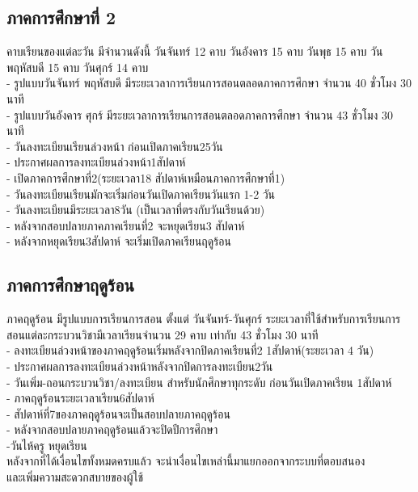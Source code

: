 \subsection{ภาคการศึกษาที่ 2}
  คาบเรียนของแต่ละวัน มีจำนวนดังนี้ วันจันทร์ 12 คาบ วันอังคาร 15 คาบ วันพุธ 15 คาบ วันพฤหัสบดี 15 คาบ วันศุกร์ 14 คาบ \\
  - รูปแบบวันจันทร์ พฤหัสบดี มีระยะเวลาการเรียนการสอนตลอดภาคการศึกษา จำนวน 40 ชั่วโมง 30 นาที \\
  - รูปแบบวันอังคาร ศุกร์ มีระยะเวลาการเรียนการสอนตลอดภาคการศึกษา จำนวน 43 ชั่วโมง 30 นาที \\
  - วันลงทะเบียนเรียนล่วงหน้า ก่อนเปิดภาคเรียน25วัน \\
  - ประกาศผลการลงทะเบียนล่วงหน้า1สัปดาห์ \\
  - เปิดภาคการศึกษาที่2(ระยะเวลา18 สัปดาห์เหมือนภาคการศึกษาที่1) \\
  - วันลงทะเบียนเรียนมักจะเริ่มก่อนวันเปิดภาคเรียนวันแรก 1-2 วัน \\
  - วันลงทะเบียนมีระยะเวลา8วัน (เป็นเวลาที่ตรงกับวันเรียนด้วย) \\
  - หลังจากสอบปลายภาคภาคเรียนที่2 จะหยุดเรียน3 สัปดาห์ \\
  - หลังจากหยุดเรียน3สัปดาห์ จะเริ่มเปิดภาคเรียนฤดูร้อน \\
\subsection{ภาคการศึกษาฤดูร้อน}
  ภาคฤดูร้อน มีรูปแบบการเรียนการสอน ตั้งแต่ วันจันทร์-วันศุกร์ ระยะเวลาที่ใช้สำหรับการเรียนการสอนแต่ละกระบวนวิชามีเวลาเรียนจำนวน 29 คาบ เท่ากับ 43 ชั่วโมง 30 นาที \\
  - ลงทะเบียนล่วงหน้าของภาคฤดูร้อนเริ่มหลังจากปิดภาคเรียนที่2 1สัปดาห์(ระยะเวลา 4 วัน) \\
  - ประกาศผลการลงทะเบียนล่วงหน้าหลังจากปิดการลงทะเบียน2วัน \\
  - วันเพิ่ม-ถอนกระบวนวิชา/ลงทะเบียน สำหรับนักศึกษาทุกระดับ ก่อนวันเปิดภาคเรียน 1สัปดาห์ \\
  - ภาคฤดูร้อนระยะเวลาเรียน6สัปดาห์ \\
  - สัปดาห์ที่7ของภาคฤดูร้อนจะเป็นสอบปลายภาคฤดูร้อน \\
  - หลังจากสอบปลายภาคฤดูร้อนแล้วจะปิดปีการศึกษา \\
  -วันไห้ครู หยุดเรียน \\

หลังจากที่ได้เงื่อนไขทั้งหมดครบแล้ว จะนำเงื่อนไขเหล่านี้มาแยกออกจากระบบที่ตอบสนอง \\
และเพิ่มความสะดวกสบายของผู้ใช้

